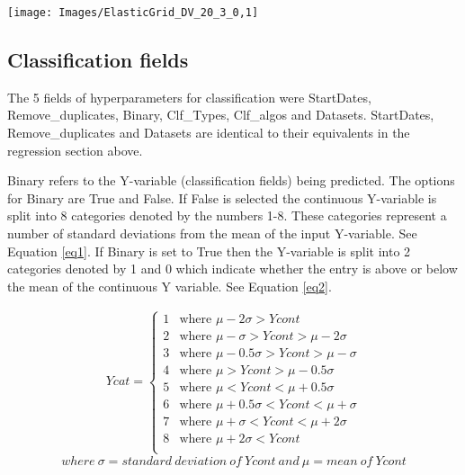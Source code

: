 \documentclass[11pt,preprint, authoryear]{elsarticle}
\let\origfigure\figure
\let\endorigfigure\endfigure
\renewenvironment{figure}[1][2] {
    \expandafter\origfigure\expandafter[H]
} {
    \endorigfigure
}
\numberwithin{equation}{section}
\numberwithin{figure}{section}
\numberwithin{table}{section}
\begin{document}
\begin{figure}[H]

{\centering \texttt{[image: Images/ElasticGrid\_DV\_20\_3\_0,1]} 

}

\caption{Elastic net: test set \label{Figure18}}\label{fig:Elastic net: control set}
\end{figure}

\hypertarget{classification-fields}{%
\subsection{Classification fields}\label{classification-fields}}

The 5 fields of hyperparameters for classification were StartDates,
Remove\_duplicates, Binary, Clf\_Types, Clf\_algos and Datasets.
StartDates, Remove\_duplicates and Datasets are identical to their
equivalents in the regression section above.

Binary refers to the Y-variable (classification fields) being predicted.
The options for Binary are True and False. If False is selected the
continuous Y-variable is split into 8 categories denoted by the numbers
1-8. These categories represent a number of standard deviations from the
mean of the input Y-variable. See Equation \ref{eq1}. If Binary is set
to True then the Y-variable is split into 2 categories denoted by 1 and
0 which indicate whether the entry is above or below the mean of the
continuous Y variable. See Equation \ref{eq2}.

\begin{align} 
Ycat=   \left\{ 
\begin{array}{ll} 
      1  &\text{where } \mu-2\sigma>Ycont \label{eq1} \\
      2  &\text{where } \mu-\sigma>Ycont>\mu-2\sigma \\
      3  &\text{where } \mu-0.5\sigma>Ycont>\mu-\sigma \\
      4  &\text{where } \mu>Ycont>\mu-0.5\sigma \\
      5  &\text{where } \mu<Ycont<\mu+0.5\sigma \\
      6  &\text{where } \mu+0.5\sigma<Ycont<\mu+\sigma \\
      7  &\text{where } \mu+\sigma<Ycont<\mu+2\sigma \\
      8  &\text{where } \mu+2\sigma<Ycont \\
\end{array} 
\right. 
\end{align} \[
where \ \sigma = standard \ deviation \ of \ Ycont \ and \ \mu = mean \ of \ Ycont
\]
\end{document}
